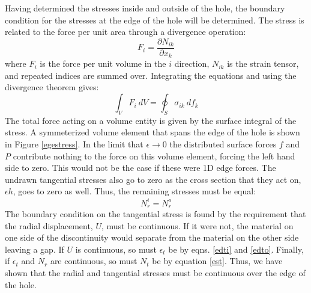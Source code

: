 Having determined the stresses inside and outside of the hole, the boundary condition for the stresses at the edge of the hole will be determined.  The stress is related to the force per unit area through a divergence operation:
\begin{equation}
F_i=\frac{\partial N_{ik}}{\partial x_k}
\end{equation}
where $F_i$ is the force per unit volume in the $i$ direction, $N_{ik}$ is the strain tensor, and repeated indices are summed over.  Integrating the equations and using the divergence theorem gives:
\begin{equation}
\int_V F_i \ dV=\oint_S \sigma_{ik} \ df_k
\end{equation}
The total force acting on a volume entity is given by the surface integral of the stress.  A symmeterized volume element that spans the edge of the hole is shown in Figure \ref{egestress}.  In the limit that $\epsilon \rightarrow 0$ the distributed surface forces $f$ and $P$ contribute nothing to the force on this volume element, forcing the left hand side to zero. This would not be the case if these were 1D edge forces. The undrawn tangential stresses also go to zero as the cross section that they act on, $\epsilon h$, goes to zero as well.  Thus, the remaining stresses must be equal:
\begin{equation}
N_r^i=N_r^o
\end{equation}
The boundary condition on the tangential stress is found by the requirement that the radial displacement, $U$, must be continuous.  If it were not, the material on one side of the discontinuity would separate from the material on the other side leaving a gap.  If $U$ is continuous, so must $\epsilon_t$ be by eqns. \ref{edti} and \ref{edto}.  Finally, if $\epsilon_t$ and $N_r$ are continuous, so must $N_t$ be by equation \ref{est}.  Thus, we have shown that the radial and tangential stresses must be continuous over the edge of the hole.


